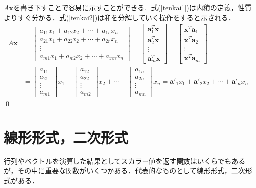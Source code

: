 \begin{pro}
$A{\bm x}$を書き下すことで容易に示すことができる．式(\ref{tenkai1})は内積の定義，性質よりすぐ分かる．式(\ref{tenkai2})は和を分解していく操作をすると示される．
\begin{align*}
A{\bm x}&=
\begin{bmatrix}
a_{11}x_1+a_{12}x_2+\cdots +a_{1n}x_n \\
a_{21}x_1+a_{22}x_2+\cdots +a_{2n}x_n \\
\vdots \\
a_{m1}x_1+a_{m2}x_2+\cdots +a_{mn}x_n
\end{bmatrix}
=
\begin{bmatrix}
{\bm a}_1^T {\bm x} \\
{\bm a}_2^T {\bm x} \\
\vdots \\
{\bm a}_m^T {\bm x}  
\end{bmatrix}
=
\begin{bmatrix}
{\bm x}^T {\bm a}_1 \\
{\bm x}^T {\bm a}_2 \\
\vdots \\
{\bm x}^T {\bm a}_m  
\end{bmatrix}\nonumber\\
&=
\begin{bmatrix}
a_{11} \\
a_{21} \\
\vdots \\
a_{m1}  
\end{bmatrix}
x_1+
\begin{bmatrix}
a_{12} \\
a_{22} \\
\vdots \\
a_{m2}  
\end{bmatrix}
x_2+\cdots+
\begin{bmatrix}
a_{1n} \\
a_{2n} \\
\vdots \\
a_{mn}  
\end{bmatrix}
x_n={\bm a}'_1x_1+{\bm a}'_2x_2+\cdots +{\bm a}'_nx_n
\end{align*}
\qed	
\end{pro}

\section{線形形式，二次形式}
行列やベクトルを演算した結果としてスカラー値を返す関数はいくらでもあるが，その中に重要な関数がいくつかある．代表的なものとして線形形式，二次形式がある．

